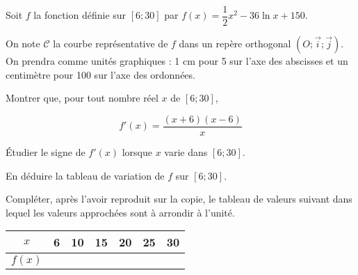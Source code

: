 

Soit $f$ la fonction définie sur $[6; 30]$ par $f(x) = \dfrac{1}{2}x^2 - 36 \ln x + 150$.

On note $\mathcal{C}$ la courbe représentative de $f$ dans un repère orthogonal $\left(O ; \overrightarrow{i} ; \overrightarrow{j} \right)$. On prendra comme unités graphiques : 1 cm pour 5 sur l'axe des abscisses et un centimètre pour 100 sur l'axe des ordonnées.


 \subquestion{}
 Montrer que, pour tout nombre réel $x$ de $[6;30]$,

\begin{equation*}
f'(x) = \dfrac{(x+6)(x-6)}{x}
\end{equation*}


 \subquestion{}
 Étudier le signe de $f'(x)$ lorsque $x$ varie dans $[6;30]$.


 \subquestion{}
 En déduire la tableau de variation de $f$ sur $[6;30]$.



 \subquestion{}
Compléter, après l'avoir reproduit sur la copie, le tableau de valeurs suivant dans lequel les valeurs approchées sont à arrondir à l'unité.

\begin{center}
\begin{tabular}{|c|c|c|c|c|c|c|}
\hline
$x$    & 6 & 10 & 15 & 20 & 25 & 30 \\ \hline
$f(x)$ & \hspace{15mm}  &  \hspace{15mm}  &  \hspace{15mm}  &  \hspace{15mm}  &  \hspace{15mm}  &  \hspace{15mm}  \\ \hline
\end{tabular}
\end{center}

